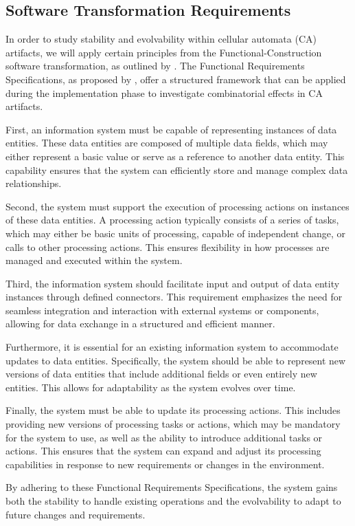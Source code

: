 \subsection{Software Transformation Requirements} \label{sec_requirements_transformation}

In order to study stability and evolvability within cellular automata (CA) artifacts, we
will apply certain principles from the Functional-Construction software transformation, as
outlined by \textcite[251]{mannaert_normalized_2016}. The Functional Requirements
Specifications, as proposed by \textcite[254-261]{mannaert_normalized_2016}, offer a
structured framework that can be applied during the implementation phase to investigate
combinatorial effects in CA artifacts.

First, an information system must be capable of representing instances of data entities.
These data entities are composed of multiple data fields, which may either represent a
basic value or serve as a reference to another data entity. This capability ensures that
the system can efficiently store and manage complex data relationships.

Second, the system must support the execution of processing actions on instances of these
data entities. A processing action typically consists of a series of tasks, which may
either be basic units of processing, capable of independent change, or calls to other
processing actions. This ensures flexibility in how processes are managed and executed
within the system.

Third, the information system should facilitate input and output of data entity instances
through defined connectors. This requirement emphasizes the need for seamless integration
and interaction with external systems or components, allowing for data exchange in a
structured and efficient manner.

Furthermore, it is essential for an existing information system to accommodate updates to
data entities. Specifically, the system should be able to represent new versions of data
entities that include additional fields or even entirely new entities. This allows for
adaptability as the system evolves over time.

Finally, the system must be able to update its processing actions. This includes providing
new versions of processing tasks or actions, which may be mandatory for the system to use,
as well as the ability to introduce additional tasks or actions. This ensures that the
system can expand and adjust its processing capabilities in response to new requirements
or changes in the environment.

By adhering to these Functional Requirements Specifications, the system gains both the
stability to handle existing operations and the evolvability to adapt to future changes
and requirements.
